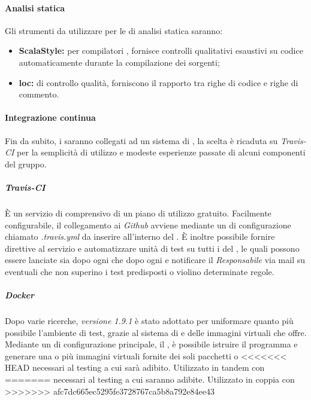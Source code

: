 \documentclass{scalatekids-article}
\begin{document}
\paragraph{Analisi statica}
\label{sec:AnalisiStatica}
Gli strumenti da utilizzare per le  di analisi statica saranno:
\begin{itemize}
\item\textbf{ScalaStyle:}  per compilatori , fornisce controlli qualitativi esaustivi su codice automaticamente durante la compilazione dei sorgenti;
\item\textbf{loc:}  di controllo qualità, forniscono il rapporto tra righe di codice e righe di commento.
\end{itemize}
\paragraph{Integrazione continua}
Fin da subito, i  saranno collegati ad un sistema di
, la scelta è ricaduta su \textit{Travis-CI} per la
semplicità di utilizzo e modeste esperienze passate di alcuni componenti del
gruppo.
\subparagraph{Travis-CI}
È un servizio di  comprensivo di un piano di
utilizzo gratuito. Facilmente configurabile, il collegamento ai 
\textit{Github} avviene mediante un  di configurazione chiamato \textit{.travis.yml}
da inserire all'interno del . È inoltre possibile fornire
direttive al servizio e automatizzare unità di test su tutti i  del
, le quali possono essere lanciate sia dopo ogni 
che dopo ogni  e notificare il \textit{Responsabile} via mail su
eventuali  che non superino i test predisposti o violino
determinate regole.
\subparagraph{Docker}
Dopo varie ricerche, \textit{ versione 1.9.1} è stato adottato per uniformare quanto più
possibile l'ambiente di test, grazie al sistema di  e
 delle immagini virtuali che offre.\\ Mediante un  di
configurazione principale, il , è possibile istruire il
programma e generare una o più immagini virtuali fornite dei soli pacchetti o
<<<<<<< HEAD
 necessari al testing a cui sarà adibito. Utilizzato in tandem con
=======
 necessari al testing a cui saranno adibite. Utilizzato in coppia con
>>>>>>> afc7dc665ec5295fe3728767ca5b8a792e84ee43
\end{document}
